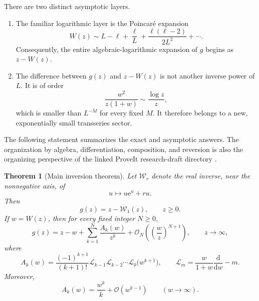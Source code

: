 \documentclass[11pt]{article}
\theoremstyle{clean}
\newtheorem{theorem}{Theorem}[section]
\newcommand{\rLambert}{\mathcal W}
\newcommand{\e}{\mathrm e}
\newcommand{\bigO}{\mathcal O}
\begin{document}
There are two distinct asymptotic layers.

\begin{enumerate}[label=\textbf{\arabic*.},leftmargin=2.2em]
\item The familiar logarithmic layer is the Poincar\'e expansion
\[
 W(z)\sim L-\ell+\frac{\ell}{L}
 +\frac{\ell(\ell-2)}{2L^2}+\cdots.
\]
Consequently, the entire algebraic-logarithmic expansion of \(g\) begins as
\(z-W(z)\).

\item The difference between \(g(z)\) and \(z-W(z)\) is not another inverse
power of \(L\).  It is of order
\[
 \frac{w^2}{z(1+w)}\sim\frac{\log z}{z},
\]
which is smaller than \(L^{-M}\) for every fixed \(M\).  It therefore belongs
to a new, exponentially small transseries sector.
\end{enumerate}

The following statement summarizes the exact and asymptotic answers.  The organization by algebra, differentiation, composition, and reversion is also the organizing perspective of the linked ProveIt research-draft directory \cite{ProveItDrafts}.

\begin{theorem}[Main inversion theorem]\label{thm:main}
Let \(\rLambert_r\) denote the real inverse, near the nonnegative axis, of
\begin{equation}\label{eq:rLambertDef}
  u\longmapsto u\e^u+ru.
\end{equation}
Then
\begin{equation}\label{eq:exactinverse}
  g(z)=z-\rLambert_1(z),\qquad z\ge0.
\end{equation}
If \(w=W(z)\), then for every fixed integer \(N\ge0\),
\begin{equation}\label{eq:mainexpansion}
  g(z)=z-w+\sum_{k=1}^{N}\frac{A_k(w)}{z^k}
  +\bigO_N\!\left(\left(\frac{w}{z}\right)^{N+1}\right),
  \qquad z\to\infty,
\end{equation}
where
\begin{equation}\label{eq:Akoperator}
  A_k(w)=\frac{(-1)^{k+1}}{(k+1)!}
  \mathcal L_{k-1}\mathcal L_{k-2}\cdots\mathcal L_0
  \bigl(w^{k+1}\bigr),
  \qquad
  \mathcal L_m=\frac{w}{1+w}\frac{\mathrm d}{\mathrm dw}-m.
\end{equation}
Moreover,
\begin{equation}\label{eq:Akleading}
  A_k(w)=\frac{w^k}{k}+\bigO(w^{k-1})\qquad(w\to\infty).
\end{equation}
\end{theorem}
\end{document}

